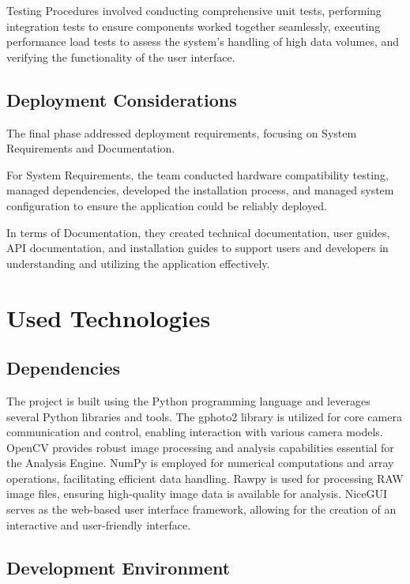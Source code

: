 Testing Procedures involved conducting comprehensive unit tests, performing integration tests to ensure components worked together seamlessly, executing performance load tests to assess the system's handling of high data volumes, and verifying the functionality of the user interface.

\subsection{Deployment Considerations}

The final phase addressed deployment requirements, focusing on System Requirements and Documentation.

For System Requirements, the team conducted hardware compatibility testing, managed dependencies, developed the installation process, and managed system configuration to ensure the application could be reliably deployed.

In terms of Documentation, they created technical documentation, user guides, API documentation, and installation guides to support users and developers in understanding and utilizing the application effectively.

\section{Used Technologies}

\subsection{Dependencies}

The project is built using the Python programming language and leverages several Python libraries and tools. The gphoto2 library is utilized for core camera communication and control, enabling interaction with various camera models. OpenCV provides robust image processing and analysis capabilities essential for the Analysis Engine. NumPy is employed for numerical computations and array operations, facilitating efficient data handling. Rawpy is used for processing RAW image files, ensuring high-quality image data is available for analysis. NiceGUI serves as the web-based user interface framework, allowing for the creation of an interactive and user-friendly interface.

\subsection{Development Environment}

